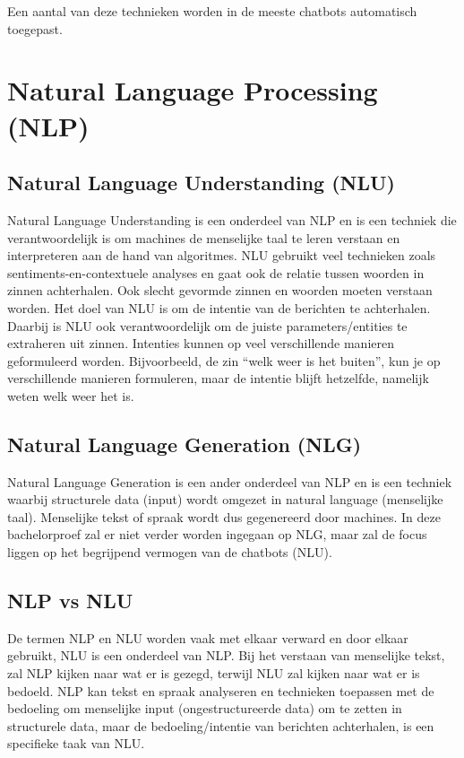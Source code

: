 Een aantal van deze technieken worden in de meeste chatbots automatisch toegepast.

\newpage
\section{Natural Language Processing (NLP)}
\label{sec:nlp}

\subsection{Natural Language Understanding (NLU)}
\label{subsec:nlp-nlu}

Natural Language Understanding is een onderdeel van NLP en is een techniek die verantwoordelijk is om machines de menselijke taal te leren verstaan en interpreteren aan de hand van algoritmes. NLU gebruikt veel technieken zoals sentiments-en-contextuele analyses en gaat ook de relatie tussen woorden in zinnen achterhalen. Ook slecht gevormde zinnen en woorden moeten verstaan worden. Het doel van NLU is om de intentie van de berichten te achterhalen. Daarbij is NLU ook verantwoordelijk om de juiste parameters/entities te extraheren uit zinnen. Intenties kunnen op veel verschillende manieren geformuleerd worden. Bijvoorbeeld, de zin “welk weer is het buiten”,  kun je op verschillende manieren formuleren, maar de intentie blijft hetzelfde, namelijk weten welk weer het is.


\subsection{Natural Language Generation (NLG)}
\label{subsec:nlp-nlg}


Natural Language Generation is een ander onderdeel van NLP en is een techniek waarbij structurele data (input) wordt omgezet in natural language (menselijke taal). Menselijke tekst of spraak wordt dus gegenereerd door machines. In deze bachelorproef zal er niet verder worden ingegaan op NLG, maar zal de focus liggen op het begrijpend vermogen van de chatbots (NLU).


\subsection{NLP vs NLU}
\label{subsec:nlp-nlp-vs-nlu}


De termen NLP en NLU worden vaak met elkaar verward en door elkaar gebruikt, NLU is een onderdeel van NLP. Bij het verstaan van menselijke tekst, zal NLP kijken naar wat er is gezegd, terwijl NLU zal kijken naar wat er is bedoeld. NLP kan tekst en spraak analyseren en technieken toepassen met de bedoeling om menselijke input (ongestructureerde data) om te zetten in structurele data, maar de bedoeling/intentie van berichten achterhalen, is een specifieke taak van NLU. 

